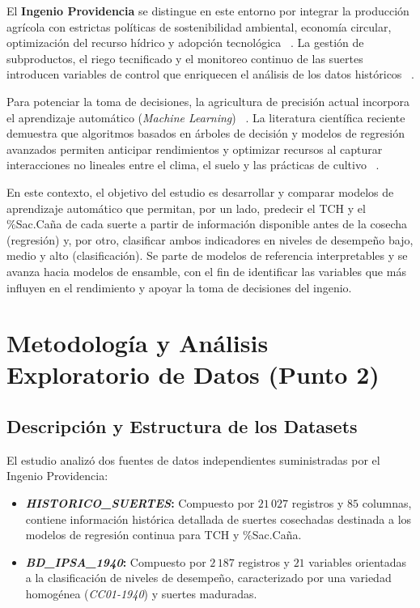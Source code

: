 \documentclass[conference]{IEEEtran}
\begin{document}
El \textbf{Ingenio Providencia} se distingue en este entorno por integrar la producción agrícola con estrictas políticas de sostenibilidad ambiental, economía circular, optimización del recurso hídrico y adopción tecnológica ~\cite{providencia}. La gestión de subproductos, el riego tecnificado y el monitoreo continuo de las suertes introducen variables de control que enriquecen el análisis de los datos históricos ~\cite{providencia}.

Para potenciar la toma de decisiones, la agricultura de precisión actual incorpora el aprendizaje automático (\textit{Machine Learning}) ~\cite{revision2025a, revision2025b}. La literatura científica reciente demuestra que algoritmos basados en árboles de decisión y modelos de regresión avanzados permiten anticipar rendimientos y optimizar recursos al capturar interacciones no lineales entre el clima, el suelo y las prácticas de cultivo ~\cite{revision2025a, revision2025b}.

En este contexto, el objetivo del estudio es desarrollar y comparar modelos de aprendizaje automático que permitan, por un lado, predecir el TCH y el \%Sac.Caña de cada suerte a partir de información disponible antes de la cosecha (regresión) y, por otro, clasificar ambos indicadores en niveles de desempeño bajo, medio y alto (clasificación). Se parte de modelos de referencia interpretables y se avanza hacia modelos de ensamble, con el fin de identificar las variables que más influyen en el rendimiento y apoyar la toma de decisiones del ingenio.

\section{Metodología y Análisis Exploratorio de Datos (Punto 2)}

\subsection{Descripción y Estructura de los Datasets}
El estudio analizó dos fuentes de datos independientes suministradas por el Ingenio Providencia:
\begin{itemize}
    \item \textbf{\textit{HISTORICO\_SUERTES}:} Compuesto por $21\,027$ registros y $85$ columnas, contiene información histórica detallada de suertes cosechadas destinada a los modelos de regresión continua para TCH y \%Sac.Caña.
    \item \textbf{\textit{BD\_IPSA\_1940}:} Compuesto por $2\,187$ registros y $21$ variables orientadas a la clasificación de niveles de desempeño, caracterizado por una variedad homogénea (\textit{CC01-1940}) y suertes maduradas.
\end{itemize}
\end{document}
